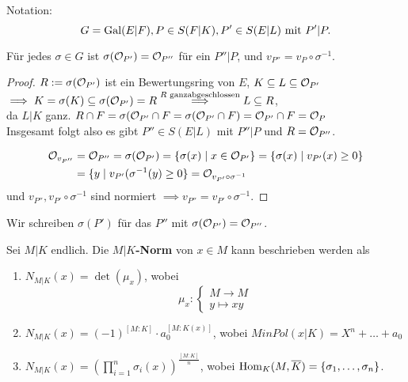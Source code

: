 Notation:
$$ G = \operatorname{Gal}(E|F), P \in S(F|K), P' \in S(E|L) \text{ mit } P'|P.$$

\begin{lemma}
    Für jedes $\sigma \in G$ ist $\sigma(\mathcal{O}_{P'}) = \mathcal{O}_{P''}$ für ein $P''|P$, und $v_{P''} = v_P \circ \sigma^{-1}$.
\end{lemma}
\begin{proof}
    $R:=\sigma(\mathcal{O}_{P'})$ ist ein Bewertungsring von $E$, $K \subseteq L \subseteq \mathcal{O}_{P'}$\\
    $\implies K = \sigma(K) \subseteq \sigma(\mathcal{O}_{P'}) = R \stackrel{R\text{ ganzabgeschlossen}}{\implies} L \subseteq R$,\\
    da $L|K$ ganz. $R \cap F = \sigma(\mathcal{O}_{P'} \cap F = \sigma(\mathcal{O}_{P'}\cap F) = \mathcal{O}_{P'} \cap F = \mathcal{O}_P$\\
    Insgesamt folgt also es gibt $P'' \in S(E|L)$ mit $P''|P$ und $R=\mathcal{O}_{P''}$.

    \begin{align*}
        \mathcal{O}_{v_{P''}} & = \mathcal{O}_{P''} = \sigma(\mathcal{O}_{P'}) = \{\sigma(x) \mid x \in \mathcal{O}_{P'}\} = \{\sigma(x) \mid v_{P'}(x) \geq 0\}\\
        & = \{y \mid v_{P'}(\sigma^{-1}(y)\geq 0\} = \mathcal{O}_{v_{P'}\circ\sigma^{-1}}
    \end{align*}
    und $v_{P''}, v_{P'}\circ \sigma^{-1}$ sind normiert $\implies v_{P''} = v_{P'} \circ \sigma^{-1}$.
\end{proof}

\begin{definition}
    Wir schreiben $\sigma(P')$ für das $P''$ mit $\sigma(\mathcal{O}_{P'}) = \mathcal{O}_{P''}$.
\end{definition}

\begin{erinnerungnr}
    Sei $M|K$ endlich. Die \textbf{$M|K$-Norm} von $x \in M$ kann beschrieben werden als
    \begin{enumerate}[label=(\arabic*)]
        \item $N_{M|K}(x) = \det(\mu_x)$, wobei
        $$ \mu_x : \begin{cases}
            M \to M\\
            y \mapsto xy
        \end{cases}$$

        \item $N_{M|K}(x) = (-1)^{[M:K]} \cdot a_0^{[M:K(x)]}$, wobei $MinPol(x|K) = X^n + \ldots + a_0$
        \item $N_{M|K}(x) = \left(\prod\limits_{i=1}^n \sigma_i(x)\right)^{\frac{[M:K]}{n}}$, wobei $\operatorname{Hom}_K(M, \overline{K}) = \{\sigma_1, \ldots, \sigma_n\}$.
    \end{enumerate}
\end{erinnerungnr}

